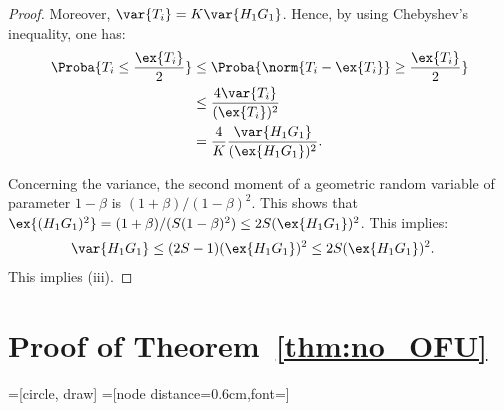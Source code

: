 \begin{subappendices}
\begin{proof}
    Moreover, $\var{T_i} = K\var{H_1G_1}$. Hence, by using Chebyshev's inequality, one has:
    \begin{align*}
        \Proba{T_i \le \frac{\ex{T_i}}{2}} &\le \Proba{\norm{T_i-\ex{T_i}} \ge \frac{\ex{T_i}}{2}}\\
        &\le \frac{4\var{T_i}}{(\ex{T_i})^2}\\
        &= \frac{4}{K} \frac{\var{H_1G_1}}{(\ex{H_1G_1})^2}.
    \end{align*}
    
    
    Concerning the variance, the second moment of a geometric random variable of parameter $1-\beta$ is $(1+\beta)/(1-\beta)^2$. This shows that $\ex{(H_1G_1)^2}=(1+\beta)/(S(1-\beta)^2)\le 2S(\ex{H_1G_1})^2$. This implies:
    \begin{align*}
        \var{H_1G_1} &\le (2S-1)(\ex{H_1G_1})^2\le 2S(\ex{H_1G_1})^2.        
    \end{align*}
    This implies (iii).
\end{proof}


\section{Proof of Theorem~\ref{thm:no_OFU}}
\label{apx:proof_OFU}

=[circle, draw]
=[node distance=0.6cm,font=\small]


\end{subappendices}
